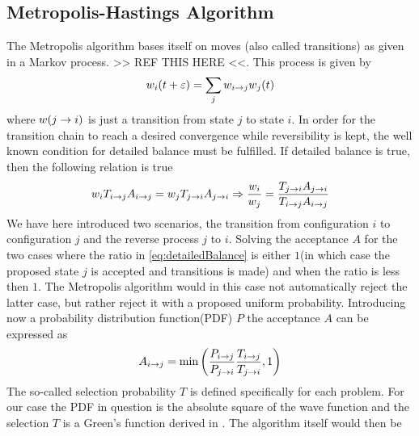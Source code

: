     \subsection{Metropolis-Hastings Algorithm\label{susec:MHAlg}}
        The Metropolis algorithm bases itself on moves (also called
        transitions) as given in a Markov process. >> REF THIS HERE <<. This
        process is given by
            \begin{equation}
                w_i(t+\varepsilon) = \sum_jw_{i\rightarrow j}w_j(t)
            \end{equation}
        where $w(j\rightarrow i)$ is just a transition from state $j$ to state $i$.
        In order for the transition chain to reach a desired convergence while
        reversibility is kept, the well known condition for detailed balance
        must be fulfilled\cite{statmech}. If detailed balance is true, then the
        following relation is true
            \begin{equation}
                w_i T_{i\rightarrow j}A_{i\rightarrow j} = w_j T_{j\rightarrow i}A_{j\rightarrow i}
                \Rightarrow \frac{w_i}{w_j} =
                \frac{T_{j\rightarrow i}A_{j\rightarrow i}}{T_{i\rightarrow j}A_{i\rightarrow j}}
                \label{eq:detailedBalance}
            \end{equation}
        We have here introduced two scenarios, the transition from
        configuration $i$ to configuration $j$ and the reverse process $j$ to
        $i$. Solving the acceptance $A$ for the two cases where the ratio in
        \ref{eq:detailedBalance} is either $1$(in which case the proposed state
        $j$ is accepted and transitions is made) and when the ratio is less
        then $1$. The Metropolis algorithm would in this case not automatically
        reject the latter case, but rather reject it with a proposed uniform
        probability. Introducing now a probability distribution function(PDF) $P$
        the acceptance $A$ can be expressed as
            \begin{equation}
                A_{i\rightarrow j} =
                \text{min}\left(\frac{P_{i\rightarrow j}}{P_{j\rightarrow i}}
                \frac{T_{i\rightarrow j}}{T_{j\rightarrow i}} ,1\right)
                \label{eq:metropolisAcceptance}
            \end{equation}
        The so-called selection probability $T$ is defined specifically for
        each problem. For our case the PDF in question is the absolute square
        of the wave function and the selection $T$ is a Green's function
        derived in .  The algorithm itself would then be
